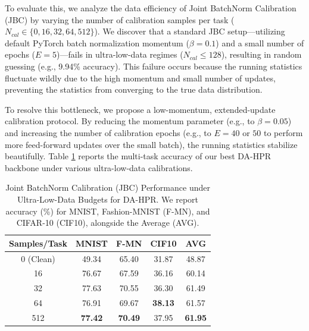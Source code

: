\documentclass{article}
\theoremstyle{plain}
\theoremstyle{definition}
\theoremstyle{remark}
\begin{document}
To evaluate this, we analyze the data efficiency of Joint BatchNorm Calibration (JBC) by varying the number of calibration samples per task ($N_{cal} \in \{0, 16, 32, 64, 512\}$). We discover that a standard JBC setup—utilizing default PyTorch batch normalization momentum ($\beta = 0.1$) and a small number of epochs ($E=5$)—fails in ultra-low-data regimes ($N_{cal} \le 128$), resulting in random guessing (e.g., 9.94\% accuracy). This failure occurs because the running statistics fluctuate wildly due to the high momentum and small number of updates, preventing the statistics from converging to the true data distribution.

To resolve this bottleneck, we propose a low-momentum, extended-update calibration protocol. By reducing the momentum parameter (e.g., to $\beta = 0.05$) and increasing the number of calibration epochs (e.g., to $E=40$ or $50$ to perform more feed-forward updates over the small batch), the running statistics stabilize beautifully. Table \ref{submission3:tab:data_efficiency} reports the multi-task accuracy of our best DA-HPR backbone under various ultra-low-data calibrations.

\begin{table}[h]
\caption{Joint BatchNorm Calibration (JBC) Performance under Ultra-Low-Data Budgets for DA-HPR. We report accuracy (\%) for MNIST, Fashion-MNIST (F-MN), and CIFAR-10 (CIF10), alongside the Average (AVG).}
\label{submission3:tab:data_efficiency}
\vskip 0.15in
\begin{center}
\begin{small}
\begin{sc}
\begin{tabular}{ccccc}
\toprule
Samples/Task & MNIST & F-MN & CIF10 & AVG \\
\midrule
0 (Clean) & 49.34 & 65.40 & 31.87 & 48.87 \\
16 & 76.67 & 67.59 & 36.16 & 60.14 \\
32 & 77.63 & 70.55 & 36.30 & 61.49 \\
64 & 76.91 & 69.67 & \textbf{38.13} & 61.57 \\
512 & \textbf{77.42} & \textbf{70.49} & 37.95 & \textbf{61.95} \\
\bottomrule
\end{tabular}
\end{sc}
\end{small}
\end{center}
\vskip -0.1in
\end{table}
\end{document}
